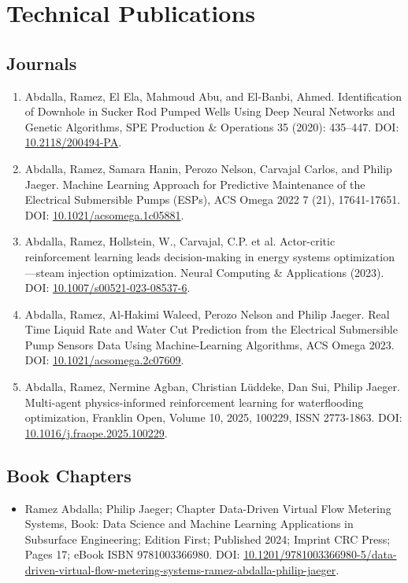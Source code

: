 \documentclass[a4paper,10pt]{article}
\begin{document}
\vspace{3mm}

\section*{Technical Publications}
\subsection*{Journals}
\begin{enumerate}[leftmargin=0.5cm]
    \item Abdalla, Ramez, El Ela, Mahmoud Abu, and El-Banbi, Ahmed. Identification of Downhole in Sucker Rod Pumped Wells Using Deep Neural Networks and Genetic Algorithms, SPE Production \& Operations 35 (2020): 435–447. DOI: \href{https://doi.org/10.2118/200494-PA}{10.2118/200494-PA}.
    \item Abdalla, Ramez, Samara Hanin, Perozo Nelson, Carvajal Carlos, and Philip Jaeger. Machine Learning Approach for Predictive Maintenance of the Electrical Submersible Pumps (ESPs), ACS Omega 2022 7 (21), 17641-17651. DOI: \href{https://doi.org/10.1021/acsomega.1c05881}{10.1021/acsomega.1c05881}.
    \item Abdalla, Ramez, Hollstein, W., Carvajal, C.P. et al. Actor-critic reinforcement learning leads decision-making in energy systems optimization—steam injection optimization. Neural Computing \& Applications (2023). DOI: \href{https://doi.org/10.1007/s00521-023-08537-6}{10.1007/s00521-023-08537-6}.
    \item Abdalla, Ramez, Al-Hakimi Waleed, Perozo Nelson and Philip Jaeger. Real Time Liquid Rate and Water Cut Prediction from the Electrical Submersible Pump Sensors Data Using Machine-Learning Algorithms, ACS Omega 2023. DOI: \href{https://doi.org/10.1021/acsomega.2c07609}{10.1021/acsomega.2c07609}.
    \item Abdalla, Ramez, Nermine Agban, Christian Lüddeke, Dan Sui, Philip Jaeger. Multi-agent physics-informed reinforcement learning for waterflooding optimization, Franklin Open, Volume 10, 2025, 100229, ISSN 2773-1863. DOI: \href{https://doi.org/10.1016/j.fraope.2025.100229}{10.1016/j.fraope.2025.100229}.
\end{enumerate}


\subsection*{Book Chapters}
\begin{itemize}[leftmargin=0.5cm]
    \item Ramez Abdalla; Philip Jaeger; Chapter Data-Driven Virtual Flow Metering Systems, Book: Data Science and Machine Learning Applications in Subsurface Engineering; Edition First; Published 2024; Imprint CRC Press; Pages 17; eBook ISBN 9781003366980. DOI: \href{https://www.taylorfrancis.com/chapters/edit/10.1201/9781003366980-5/data-driven-virtual-flow-metering-systems-ramez-abdalla-philip-jaeger}{10.1201/9781003366980-5/data-driven-virtual-flow-metering-systems-ramez-abdalla-philip-jaeger}.
\end{itemize}
\end{document}
